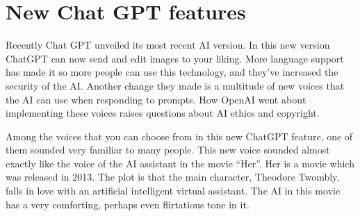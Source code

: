 \section{New Chat GPT features}
\label{sec:ai}






Recently Chat GPT unveiled its most recent AI version. In this new version ChatGPT can now send and edit images to your liking. More language support has made it so more people can use this technology, and they’ve increased the security of the AI. Another change they made is a multitude of new voices that the AI can use when responding to prompts. How OpenAI went about implementing these voices raises questions about AI ethics and copyright. \cite{ChatGPT-changes}

Among the voices that you can choose from in this new ChatGPT feature, one of them sounded very familiar to many people. This new voice sounded almost exactly like the voice of the AI assistant in the movie “Her”. Her is a movie which was released in 2013. The plot is that the main character, Theodore Twombly, falls in love with an artificial intelligent virtual assistant. The AI in this movie has a very comforting, perhaps even flirtatious tone in it. \citep{Her} 

